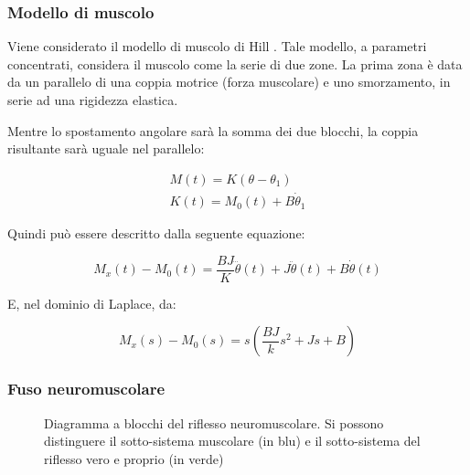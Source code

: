 \subsubsection{Modello di muscolo}

Viene considerato il modello di muscolo di Hill \cite{hill_heat_1938}. Tale modello, a parametri concentrati, considera il muscolo come la serie di due zone. La prima zona è data da un parallelo di una coppia motrice (forza muscolare) e uno smorzamento, in serie ad una rigidezza elastica.

Mentre lo spostamento angolare sarà la somma dei due blocchi, la coppia risultante sarà uguale nel parallelo:

\begin{equation}
	\begin{gathered}
		M(t)=K\left(\theta-\theta_{1}\right) \\
		K(t)=M_{0}(t)+B \dot{\theta}_{1}
	\end{gathered}
\end{equation}

Quindi può essere descritto dalla seguente equazione:

\begin{equation}
	M_{x}(t)-M_{0}(t)=\frac{B J}{K} \dddot{\theta}(t)+J \ddot{\theta}(t)+B \dot{\theta}(t)
\end{equation}

E, nel dominio di Laplace, da:

\begin{equation}
	M_{x}(s)-M_{0}(s)=s\left(\frac{B J}{k} s^{2}+J s+B\right)
\end{equation}

\subsubsection{Fuso neuromuscolare}

\begin{figure}[t!]
	\centering
	\footnotesize{\def\svgwidth{0.95\linewidth}
		}
	\caption{Diagramma a blocchi del riflesso neuromuscolare. Si possono distinguere il sotto-sistema muscolare (in blu) e il sotto-sistema del riflesso vero e proprio (in verde)}
	\label{fig:sistemamuscolo}
\end{figure}

